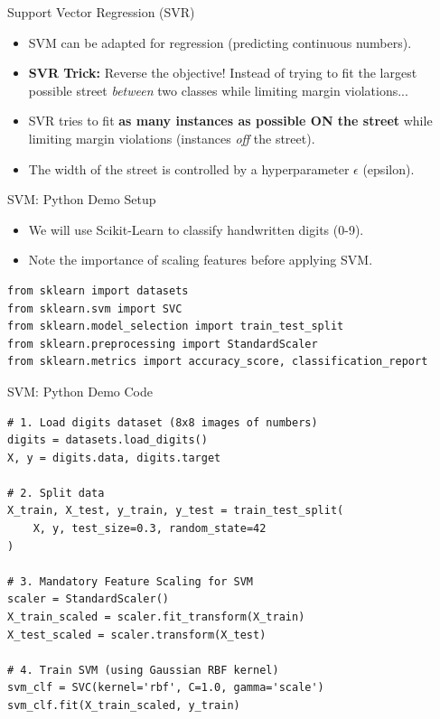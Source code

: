 \documentclass[aspectratio=169]{beamer}
\begin{document}
\begin{frame}{Support Vector Regression (SVR)}
\begin{itemize}
    \item SVM can be adapted for regression (predicting continuous numbers).
    \item \textbf{SVR Trick:} Reverse the objective! Instead of trying to fit the largest possible street \textit{between} two classes while limiting margin violations...
    \item SVR tries to fit \textbf{as many instances as possible ON the street} while limiting margin violations (instances \textit{off} the street).
    \item The width of the street is controlled by a hyperparameter $\epsilon$ (epsilon).
\end{itemize}
\end{frame}

\begin{frame}[fragile]{SVM: Python Demo Setup}
\begin{itemize}
    \item We will use Scikit-Learn to classify handwritten digits (0-9).
    \item Note the importance of scaling features before applying SVM.
\end{itemize}
\begin{verbatim}
from sklearn import datasets
from sklearn.svm import SVC
from sklearn.model_selection import train_test_split
from sklearn.preprocessing import StandardScaler
from sklearn.metrics import accuracy_score, classification_report
\end{verbatim}
\end{frame}

\begin{frame}[fragile]{SVM: Python Demo Code}
\begin{verbatim}
# 1. Load digits dataset (8x8 images of numbers)
digits = datasets.load_digits()
X, y = digits.data, digits.target

# 2. Split data
X_train, X_test, y_train, y_test = train_test_split(
    X, y, test_size=0.3, random_state=42
)

# 3. Mandatory Feature Scaling for SVM
scaler = StandardScaler()
X_train_scaled = scaler.fit_transform(X_train)
X_test_scaled = scaler.transform(X_test)

# 4. Train SVM (using Gaussian RBF kernel)
svm_clf = SVC(kernel='rbf', C=1.0, gamma='scale')
svm_clf.fit(X_train_scaled, y_train)
\end{verbatim}
\end{frame}
\end{document}
